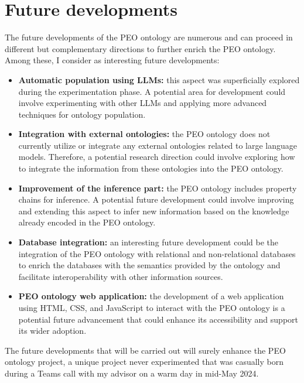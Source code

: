 \section{Future developments}
\label{section:6_2_future}
The future developments of the PEO ontology are numerous and can proceed in different but complementary directions to further enrich the PEO ontology. Among these, I consider as interesting future developments:
\begin{itemize}
    \item \textbf{Automatic population using LLMs:} this aspect was superficially explored during the experimentation phase. A potential area for development could involve experimenting with other LLMs and applying more advanced techniques for ontology population.

    \item \textbf{Integration with external ontologies:} the PEO ontology does not currently utilize or integrate any external ontologies related to large language models. Therefore, a potential research direction could involve exploring how to integrate the information from these ontologies into the PEO ontology.

    \item \textbf{Improvement of the inference part:} the PEO ontology includes property chains for inference. A potential future development could involve improving and extending this aspect to infer new information based on the knowledge already encoded in the PEO ontology.

    \item \textbf{Database integration:} an interesting future development could be the integration of the PEO ontology with relational and non-relational databases to enrich the databases with the semantics provided by the ontology and facilitate interoperability with other information sources.

    \item \textbf{PEO ontology web application:} the development of a web application using HTML, CSS, and JavaScript to interact with the PEO ontology is a potential future advancement that could enhance its accessibility and support its wider adoption. 
\end{itemize}
The future developments that will be carried out will surely enhance the PEO ontology project, a unique project never experimented that was casually born during a Teams call with my advisor on a warm day in mid-May 2024.

